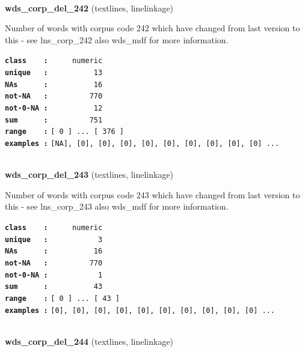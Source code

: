 \documentclass[]{article}
\begin{document}
~

\textbf{wds\_corp\_del\_242} (textlines, linelinkage)

Number of words with corpus code 242 which have changed from last
version to this - see lns\_corp\_242 also wds\_mdf for more information.

\textbf{\texttt{class\ \ \ \ :}} \texttt{~~~~~numeric}\\
\textbf{\texttt{unique\ \ \ :}} \texttt{~~~~~~~~~~13}\\
\textbf{\texttt{NAs\ \ \ \ \ \ :}} \texttt{~~~~~~~~~~16}\\
\textbf{\texttt{not-NA\ \ \ :}} \texttt{~~~~~~~~~770}\\
\textbf{\texttt{not-0-NA\ :}} \texttt{~~~~~~~~~~12}\\
\textbf{\texttt{sum\ \ \ \ \ \ :}} \texttt{~~~~~~~~~751}\\
\textbf{\texttt{range\ \ \ \ :}}
\texttt{{[}\ 0\ {]}\ ...\ {[}\ 376\ {]}}\\
\textbf{\texttt{examples\ :}}
\texttt{{[}NA{]},\ {[}0{]},\ {[}0{]},\ {[}0{]},\ {[}0{]},\ {[}0{]},\ {[}0{]},\ {[}0{]},\ {[}0{]},\ {[}0{]}\ ...}\\

~

\textbf{wds\_corp\_del\_243} (textlines, linelinkage)

Number of words with corpus code 243 which have changed from last
version to this - see lns\_corp\_243 also wds\_mdf for more information.

\textbf{\texttt{class\ \ \ \ :}} \texttt{~~~~~numeric}\\
\textbf{\texttt{unique\ \ \ :}} \texttt{~~~~~~~~~~~3}\\
\textbf{\texttt{NAs\ \ \ \ \ \ :}} \texttt{~~~~~~~~~~16}\\
\textbf{\texttt{not-NA\ \ \ :}} \texttt{~~~~~~~~~770}\\
\textbf{\texttt{not-0-NA\ :}} \texttt{~~~~~~~~~~~1}\\
\textbf{\texttt{sum\ \ \ \ \ \ :}} \texttt{~~~~~~~~~~43}\\
\textbf{\texttt{range\ \ \ \ :}}
\texttt{{[}\ 0\ {]}\ ...\ {[}\ 43\ {]}}\\
\textbf{\texttt{examples\ :}}
\texttt{{[}0{]},\ {[}0{]},\ {[}0{]},\ {[}0{]},\ {[}0{]},\ {[}0{]},\ {[}0{]},\ {[}0{]},\ {[}0{]},\ {[}0{]}\ ...}\\

~

\textbf{wds\_corp\_del\_244} (textlines, linelinkage)
\end{document}
